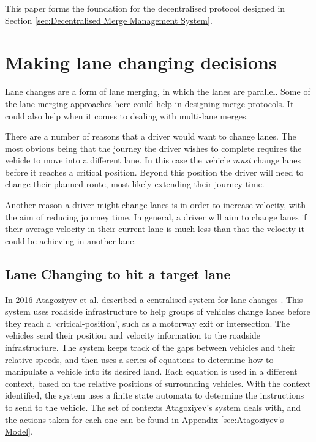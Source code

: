 This paper forms the foundation for the decentralised protocol designed in Section \ref{sec:Decentralised Merge Management System}.

\section{Making lane changing decisions}
\label{sec:Making lane changing decisions}
Lane changes are a form of lane merging, in which the lanes are parallel. Some of the lane merging approaches here could help in designing merge protocols. It could also help when it comes to dealing with multi-lane merges.

There are a number of reasons that a driver would want to change lanes. The most obvious being that the journey the driver wishes to complete requires the vehicle to move into a different lane. In this case the vehicle \emph{must} change lanes before it reaches a critical position. Beyond this position the driver will need to change their planned route, most likely extending their journey time. 

Another reason a driver might change lanes is in order to increase velocity, with the aim of reducing journey time. In general, a driver will aim to change lanes if their average velocity in their current lane is much less than that the velocity it could be achieving in another lane.

\subsection{Lane Changing to hit a target lane}
\label{subsec:Lane Changing to hit a target lane}
In 2016 Atagoziyev et al. described a centralised system for lane changes \citep{Atagoziyev2016}. This system uses roadside infrastructure to help groups of vehicles change lanes before they reach a `critical-position', such as a motorway exit or intersection. The vehicles send their position and velocity information to the roadside infrastructure. The system keeps track of the gaps between vehicles and their relative speeds, and then uses a series of equations to determine how to manipulate a vehicle into its desired land. Each equation is used in a different context, based on the relative positions of surrounding vehicles. With the context identified, the system uses a finite state automata to determine the instructions to send to the vehicle. The set of contexts Atagoziyev's system deals with, and the actions taken for each one can be found in Appendix \ref{sec:Atagoziyev's Model}.

